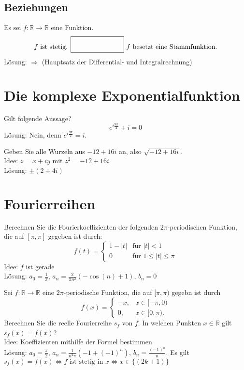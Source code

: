 \documentclass[parskip=full]{scrartcl}
\begin{document}
\subsection{Beziehungen}
Es sei $f: \mathbb{R} \to \mathbb{R}$ eine Funktion.
\begin{displaymath}
  f \text{ ist stetig. } \fbox{\rule{1in}{0pt}\rule[-0.5ex]{0pt}{4ex}} \text{ $f$ besetzt eine Stammfunktion.}
\end{displaymath}
Lösung: $\Rightarrow$ (Hauptsatz der Differential- und Integralrechnung)

\section{Die komplexe Exponentialfunktion}
Gilt folgende Aussage?
\begin{displaymath}
  e^{i \frac{9\pi}{2}} + i = 0
\end{displaymath}
Lösung: Nein, denn $e^{i \frac{9\pi}{2}} = i$.

Geben Sie alle Wurzeln aus $-12 + 16i$ an, also $\sqrt{-12 + 16i}$.\\
Idee: $z = x+iy$ mit $z^2 = -12 + 16i$\\
Lösung: $\pm (2 + 4i)$

\section{Fourierreihen}
Berechnen Sie die Fourierkoeffizienten der folgenden $2\pi$-periodischen Funktion, die auf $[\pi, \pi]$ gegeben ist durch:
\begin{displaymath}
  f(t) =
  \begin{cases}
    1 - |t|& \text{für } |t| < 1\\
    0& \text{für } 1 \leq |t| \leq \pi
  \end{cases}
\end{displaymath}
Idee: $f$ ist gerade\\
Lösung: $a_0 = \frac{1}{\pi}$, $a_n = \frac{2}{\pi n^2}(-\cos(n) + 1)$, $b_n = 0$

Sei $f : \mathbb{R} \to \mathbb{R}$ eine $2\pi$-periodische Funktion, die auf $[\pi, \pi)$ gegebn ist durch
\begin{displaymath}
  f(x) =
  \begin{cases}
    -x,& x \in [-\pi,0)\\
    0,& x \in [0,\pi).
  \end{cases}
\end{displaymath}
Berechnen Sie die reelle Fourierreihe $s_f$ von $f$.
In welchen Punkten $x \in \mathbb{R}$ gilt $s_f(x) = f(x)$?\\
Idee: Koeffizienten mithilfe der Formel bestimmen\\
Lösung: $a_0 = \frac{\pi}{2}$, $a_n = \frac{1}{n^2 \pi}(-1 + (-1)^n)$, $b_n = \frac{(-1)^n}{n}$.
Es gilt $s_f(x) = f(x) \iff f \text{ ist stetig in } x \iff x \in \{(2k+1)\}$
\end{document}
